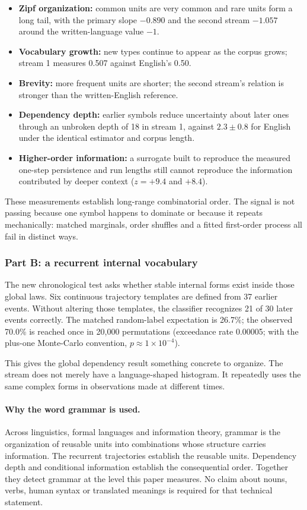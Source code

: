 \documentclass[11pt,a4paper]{article}
\begin{document}
\begin{itemize}[leftmargin=1.4em,itemsep=3pt]
\item \textbf{Zipf organization:} common units are very common and rare units form a
long tail, with the primary slope $-0.890$ and the second stream $-1.057$ around the
written-language value $-1$.
\item \textbf{Vocabulary growth:} new types continue to appear as the corpus grows;
stream 1 measures 0.507 against English's 0.50.
\item \textbf{Brevity:} more frequent units are shorter; the second stream's relation
is stronger than the written-English reference.
\item \textbf{Dependency depth:} earlier symbols reduce uncertainty about later ones
through an unbroken depth of 18 in stream 1, against $2.3 \pm 0.8$ for English under the
identical estimator and corpus length.
\item \textbf{Higher-order information:} a surrogate built to reproduce the measured
one-step persistence and run lengths still cannot reproduce the information contributed
by deeper context ($z=+9.4$ and $+8.4$).
\end{itemize}

These measurements establish long-range combinatorial order. The signal is not passing
because one symbol happens to dominate or because it repeats mechanically: matched
marginals, order shuffles and a fitted first-order process all fail in distinct ways.

\subsubsection{Part B: a recurrent internal vocabulary}

The new chronological test asks whether stable internal forms exist inside those global
laws. Six continuous trajectory templates are defined from 37 earlier events. Without
altering those templates, the classifier recognizes 21 of 30 later events correctly.
The matched random-label expectation is 26.7\%; the observed 70.0\% is reached once in
20{,}000 permutations (exceedance rate 0.00005; with the plus-one Monte-Carlo
convention, $p \approx 1\times10^{-4}$).

This gives the global dependency result something concrete to organize. The stream does
not merely have a language-shaped histogram. It repeatedly uses the same complex forms
in observations made at different times.

\paragraph{Why the word grammar is used.} Across linguistics, formal languages and
information theory, grammar is the organization of reusable units into combinations
whose structure carries information. The recurrent trajectories establish the reusable
units. Dependency depth and conditional information establish the consequential order.
Together they detect grammar at the level this paper measures. No claim about nouns,
verbs, human syntax or translated meanings is required for that technical statement.
\end{document}
